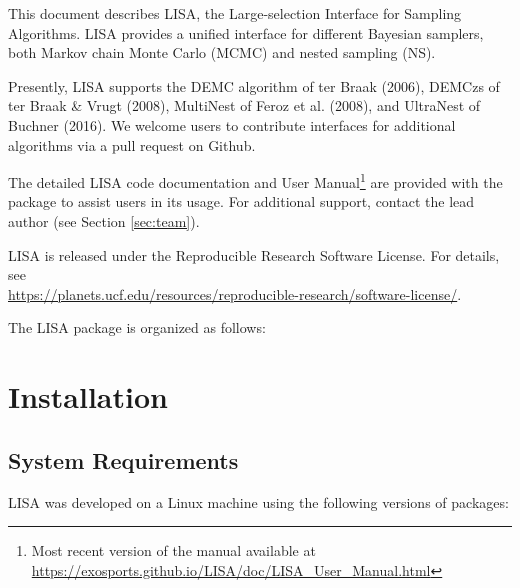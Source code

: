 \documentclass[letterpaper, 12pt]{article}
\begin{document}
\noindent This document describes LISA, the Large-selection Interface for 
Sampling Algorithms.  LISA provides a unified interface for different 
Bayesian samplers, both Markov chain Monte Carlo (MCMC) and nested sampling 
(NS).  

Presently, LISA supports the DEMC algorithm of ter Braak (2006), DEMCzs of 
ter Braak \& Vrugt (2008), MultiNest of Feroz et al. (2008), and UltraNest of 
Buchner (2016).  We welcome users to contribute interfaces for additional 
algorithms via a pull request on Github.

The detailed LISA code documentation and User Manual\footnote{Most recent version of the manual available at 
\href{https://exosports.github.io/LISA/doc/LISA_User_Manual.html}{https://exosports.github.io/LISA/doc/LISA\_User\_Manual.html}} 
are provided with the package to assist users in its usage. 
For additional support, contact the lead author (see Section \ref{sec:team}).

LISA is released under the Reproducible Research Software License.  
For details, see \\
\href{https://planets.ucf.edu/resources/reproducible-research/software-license/}{https://planets.ucf.edu/resources/reproducible-research/software-license/}.
\newline

\noindent The LISA package is organized as follows: \newline
\noindent{}
\vspace{0.7cm}

\section{Installation}
\label{sec:installation}

\subsection{System Requirements}
\label{sec:requirements}

\noindent LISA was developed on a Linux machine using the following 
versions of packages:
\end{document}
